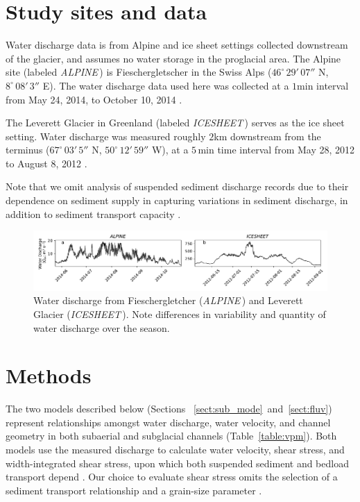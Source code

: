 \documentclass[esurf, manuscript]{copernicus}
\newcommand{\alpine}{\textit{ALPINE}\,}
\newcommand{\icesheet}{\textit{ICESHEET}\,}
\begin{document}
\section{Study sites and data}
\label{sect:ss_data}

Water discharge data is from Alpine and ice sheet settings collected downstream of the glacier, and assumes no water storage in the proglacial area.
The Alpine site (labeled \alpine{}) is  Fieschergletscher in the Swiss Alps ($46^\circ\,29'\,07''$ N, $8^\circ\,08'\,3''$ E).
The water discharge data used here was collected at a $1$\unit{min} interval from May 24, 2014, to October 10, 2014 \citep[Figure~\ref{fig:Qw}\,a][]{felix2022}.

The Leverett Glacier in Greenland (labeled \icesheet{}) serves as the ice sheet setting.
Water discharge was measured roughly $2$\unit{km} downstream from the terminus ($67^\circ\,03'\,5''$ N, $50^\circ\,12'\,59''$ W), at a $5$\,\unit{min} time interval from May 28, 2012 to August 8, 2012 \citet[][Figure~\ref{fig:Qw}\,b]{tedstone2013}.

Note that we omit analysis of suspended sediment discharge records due to their dependence on sediment supply in capturing variations in sediment discharge, in addition to sediment transport capacity \citep[e.g.][]{delaney2019}.

\begin{figure}[hbt!]
  \centering
  \includegraphics[width=0.8\linewidth]{Fig2.pdf}
  \caption{Water discharge from Fieschergletcher (\alpine) and Leverett Glacier (\icesheet).
    Note differences in variability and quantity of water discharge over the season.
  }
  \label{fig:Qw}
\end{figure}


\section{Methods}
\label{sect:meth}
The two models described below (Sections ~\ref{sect:sub_mode}~and~\ref{sect:fluv}) represent relationships amongst water discharge, water velocity, and channel geometry in both subaerial and subglacial channels (Table~\ref{table:vpm}).
Both models use the measured discharge to calculate water velocity, shear stress, and width-integrated shear stress, upon which both suspended sediment and bedload transport depend \citep[Figure \ref{fig:cartoon}; ][]{shields1936}.
Our choice to evaluate shear stress omits the selection of a sediment transport relationship and a grain-size parameter \citep[e.g.][]{shields1936,meyer1948}.
\end{document}
